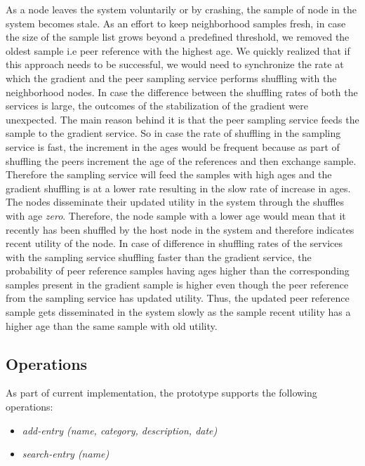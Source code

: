 \documentclass[a4paper,11pt]{kth-mag}
\begin{document}
\par  As a node leaves the system voluntarily or by crashing, the sample of node in the system becomes stale. As an effort to keep neighborhood samples fresh, in case the size of the sample list grows beyond a predefined threshold, we removed the oldest sample i.e peer reference with the highest age. We quickly realized that if this approach needs to be successful, we would need to synchronize the rate at which the gradient and the peer sampling service performs shuffling with the neighborhood nodes. In case the difference between the shuffling rates of both the services is large, the outcomes of the stabilization of the gradient were unexpected. The main reason behind it is that the peer sampling service feeds the sample to the gradient service. So in case the rate of shuffling in the sampling service is fast, the increment in the ages would be frequent because as part of shuffling the peers increment the age of the references and then exchange sample. Therefore the sampling service will feed the samples with high ages and the gradient shuffling is at a lower rate resulting in the slow rate of increase in ages. The nodes disseminate their updated utility in the system through the shuffles with age \textit{zero}. Therefore, the node sample with a lower age would mean that it recently has been shuffled by the host node in the system and therefore indicates recent utility of the node. In case of difference in shuffling rates of the services with the sampling service shuffling faster than the gradient service, the probability of peer reference samples having ages higher than the corresponding samples present in the gradient sample is higher even though the peer reference from the sampling service has updated utility. Thus, the updated peer reference sample gets disseminated in the system slowly as the sample recent utility has a higher age than the same sample with old utility.

\subsection*{Operations}
As part of current implementation, the prototype supports the following operations:

\begin{itemize}

\item \textit{add-entry (name, category, description, date)}
\item \textit{search-entry (name)}

\end{itemize}
\end{document}
